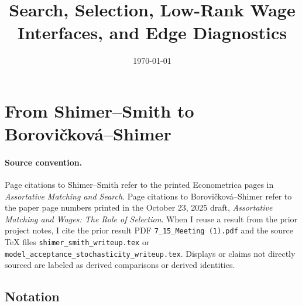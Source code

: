 ﻿\documentclass[11pt]{article}
\title{Search, Selection, Low-Rank Wage Interfaces, and Edge Diagnostics}
\author{}
\date{\today}
\newcommand{\1}{\mathbf{1}}
\begin{document}
\maketitle



\section{From Shimer--Smith to Borovi\v{c}kov\'a--Shimer}

\paragraph{Source convention.}

Page citations to Shimer--Smith refer to the printed Econometrica pages in
\emph{Assortative Matching and Search}. Page citations to Borovi\v{c}kov\'a--Shimer
refer to the paper page numbers printed in the October 23, 2025 draft,
\emph{Assortative Matching and Wages: The Role of Selection}. When I reuse a
result from the prior project notes, I cite the prior result PDF
\texttt{7\_15\_Meeting (1).pdf} and the source \TeX{} files
\texttt{shimer\_smith\_writeup.tex} or
\texttt{model\_acceptance\_stochasticity\_writeup.tex}. Displays or claims not
directly sourced are labeled as derived comparisons or derived identities.

\subsection{Notation}
\end{document}
